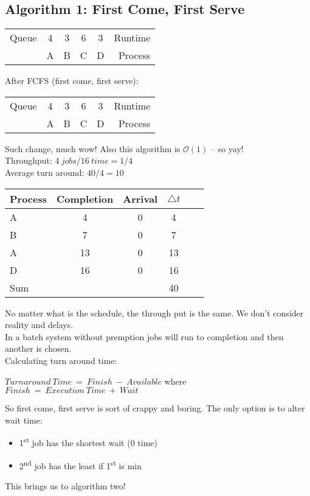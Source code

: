 \documentclass[../base_file/cs1550_notes.tex]{subfiles}
\begin{document}
\subsection{Algorithm 1: First Come, First Serve}
\begin{center}
\begin{tabular}{l*{4}{c}r}
Queue		& 4 & 3 & 6 & 3 & Runtime\\
			& A & B & C & D & Process\\
\end{tabular}
\end{center}
After FCFS (first come, first serve):\\
\begin{center}
\begin{tabular}{l*{4}{c}r}
Queue		& 4 & 3 & 6 & 3 & Runtime\\
			& A & B & C & D & Process\\
\end{tabular}
\end{center}
Such change, much wow!
Also this algorithm is $\mathcal{O}(1)$ -- so yay!\\
Throughput: $4\ jobs/16\ time = 1/4$\\
Average turn around: $40/4 = 10$\\
\begin{center}
\begin{tabular}{l*{4}{c}r}
Process		& Completion	& Arrival	& $\bigtriangleup t$\\
\hline
A			& 4				& 0			& 4\\
B			& 7				& 0			& 7\\
A			& 13			& 0			& 13\\
D			& 16 			& 0			& 16\\
\hline
Sum			&			    &	 		& 40\\
\end{tabular}
\end{center}
No matter what is the schedule, the through put is the same.
We don't consider reality and delays.\\

In a batch system without premption jobs will run to completion and then another
is chosen.\\

Calculating turn around time:\\
\begin{center}
$Turnaround\ Time\ =\ Finish\ -\ Available$ where $Finish\ =\ Execution\ Time\ +\ Wait$\\
\end{center}
So first come, first serve is sort of crappy and boring\@.  The only option is to alter 
wait time:
\begin{itemize}
	\item 1\textsuperscript{st} job has the shortest wait (0 time)
	\item 2\textsuperscript{nd} job has the least if 1\textsuperscript{st} is min
\end{itemize}
This brings us to algorithm two!\\
\end{document}
